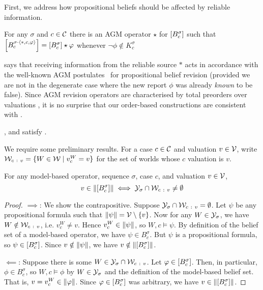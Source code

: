 First, we address how propositional beliefs should be affected by reliable
information.

\begin{axiom}[\agm{}]
    For any $\sigma$ and $c \in \mathcal{C}$ there is an AGM operator $\star$
    for $\left[{B^\sigma_c}\right]$ such that $\left[{B^{\sigma \cdot
    \langle {\ast, c, \varphi} \rangle}_c}\right] = \left[{B^\sigma_c}\right] \star \varphi$ whenever
    $\neg\phi \notin K^\sigma_c$
\end{axiom}

\agm{} says that receiving information from the reliable source $\ast$ acts in
accordance with the well-known AGM postulates~\cite{alchourron1985logic} for propositional belief
revision (provided we are not in the degenerate case where the new report
$\phi$ was already \emph{known} to be false). Since AGM revision operators are
characterised by total preorders over valuations
\cite{grove1988two,katsuno_1991}, it is no surprise that our order-based
constructions are consistent with \agm{}.

\begin{proposition}
    \label{kr_prop_examples_satisfy_agm}
    \varbasedcond{}, \partbasedcond{} and \scorebasedop{}
    satisfy \agm{}.
\end{proposition}

We require some preliminary results. For a case $c \in \mathcal{C}$ and valuation $v \in
\mathcal{V}$, write $\mathcal{W}_{c\ :\ v} = \{W \in \mathcal{W} \mid v^W_c = v\}$ for the set of
worlds whose $c$ valuation is $v$.

\begin{lemma}
    \label{kr_lemma_model_based_models_of_proppart}
    For any model-based operator, sequence $\sigma$, case $c$, and valuation
    $v \in \mathcal{V}$,
    \[
        v \in \|{\left[{B^\sigma_c}\right]}\|
        \iff
        \mathcal{Y}_\sigma \cap \mathcal{W}_{c\ :\  v} \ne \emptyset
    \]
\end{lemma}

\begin{proof}
    $\implies$: We show the contrapositive. Suppose $\mathcal{Y}_\sigma \cap \mathcal{W}_{c\
    :\ v} = \emptyset$. Let $\psi$ be any propositional formula such that
    $\|{\psi}\| = \mathcal{V} \setminus \{v\}$. Now for any $W \in \mathcal{Y}_\sigma$,
    we have $W \notin \mathcal{W}_{c\ :\  v}$, i.e. $v^W_c \ne v$. Hence $v^W_c \in
    \|{\psi}\|$, so $W, c \models \psi$. By definition of the belief set
    of a model-based operator, we have $\psi \in B^\sigma_c$. But $\psi$ is a
    propositional formula, so $\psi \in \left[{B^\sigma_c}\right]$. Since $v \notin
    \|{\psi}\|$, we have $v \notin \|{\left[{B^\sigma_c}\right]}\|$.

    $\impliedby$: Suppose there is some $W \in \mathcal{Y}_\sigma \cap \mathcal{W}_{c\ :\
    v}$. Let $\varphi \in \left[{B^\sigma_c}\right]$. Then, in particular, $\phi \in
    B^\sigma_c$, so $W, c \models \phi$ by $W \in \mathcal{Y}_\sigma$ and the definition
    of the model-based belief set. That is, $v = v^W_c \in \|{\varphi}\|$.
    Since $\varphi \in \left[{B^\sigma_c}\right]$ was arbitrary, we have $v \in
    \|{\left[{B^\sigma_c}\right]}\|$.
\end{proof}

